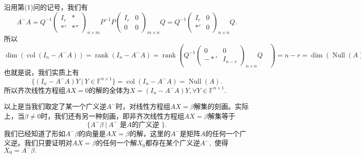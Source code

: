 沿用第(1)问的记号，我们有
$$A^-A = Q^{-1} \begin{pmatrix} I_r & * \\ *' & *'' \end{pmatrix}_{n\times m}\!\!\!\!\!\!\!\!\!\!\! P^{-1} P \begin{pmatrix} I_r & 0 \\ 0 & 0 \end{pmatrix}_{m\times n}\!\!\!\!\!\!\!\!\!\!\! Q = Q^{-1} \begin{pmatrix} I_r & 0 \\ *' & 0 \end{pmatrix}_{n\times n}\!\!\!\!\!\!\!\!\!\! Q.$$
所以
$$\dim \left( \operatorname{col}(I_n - A^-A) \right) = \operatorname{rank} (I_n - A^-A) = \operatorname{rank} \left( Q^{-1} \begin{pmatrix} 0 & 0 \\ -*' & I_{n-r} \end{pmatrix}_{n\times n}\!\!\!\!\!\!\!\!\!\! Q \hspace{1em} \right) = n - r = \dim \left( \operatorname{Null} (A) \right).$$
也就是说，我们实质上有$$\{ (I_n - A^-A)Y ~|~ Y \in \mathbb{F}^{n\times 1} \} = \operatorname{col}(I_n - A^-A) = \operatorname{Null} (A).$$
所以齐次线性方程组$AX = 0$的解的全体为$X = (I_n - A^-A)Y, \forall Y \in \mathbb{F}^{n\times 1}.$

\vspace{1em}

以上是当我们取定了某一个广义逆$A^-$时，对线性方程组$AX = \beta$解集的刻画。实际上，当$\beta \neq 0$时，我们还有另一种刻画，即非齐次线性方程组$AX = \beta$解集等于
$$\{ A^-\beta ~|~ A^- \text{ 是$A$的广义逆 } \}.$$
我们已经知道了形如$A^-\beta$的向量是$AX = \beta$的解，这里的$A^-$是矩阵$A$的任何一个广义逆。我们只要证明对$AX = \beta$的任何一个解$X_0$都存在某个广义逆$A^-,$ 使得$X_0 = A^-\beta.$

